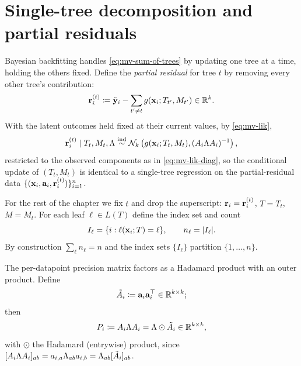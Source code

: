 \section{Single-tree decomposition and partial residuals}
\label{sec:mv-partial-resid}

Bayesian backfitting handles \eqref{eq:mv-sum-of-trees} by updating one tree
at a time, holding the others fixed. Define the \emph{partial residual} for
tree $t$ by removing every other tree's contribution:
\begin{equation}
	\label{eq:mv-partial-resid}
	\mathbf{r}_i^{(t)} \coloneqq \tilde{\mathbf{y}}_i - \sum_{t' \ne t} g(\mathbf{x}_i; T_{t'}, M_{t'})
	\in \mathbb{R}^k.
\end{equation}
With the latent outcomes held fixed at their current values, by
\eqref{eq:mv-lik},
\begin{equation}
	\label{eq:mv-partial-lik}
	\mathbf{r}_i^{(t)} \mid T_t, M_t, \Lambda \stackrel{\text{ind}}{\sim}
	\mathcal{N}_k\left(g(\mathbf{x}_i;  T_t, M_t),  (A_i \Lambda A_i)^{-1}\right),
\end{equation}
restricted to the observed components as in \eqref{eq:mv-lik-diag}, so the
conditional update of $(T_t, M_t)$ is identical to a single-tree
regression on the partial-residual data $\{(\mathbf{x}_i, \mathbf{a}_i, \mathbf{r}_i^{(t)})\}_{i=1}^n$.

For the rest of the chapter we fix $t$ and drop the superscript:
$\mathbf{r}_i = \mathbf{r}_i^{(t)}$, $T = T_t$, $M = M_t$. For each leaf $\ell \in L(T)$
define the index set and count
\begin{equation}
	\label{eq:mv-Iell}
	I_\ell = \{  i : \ell(\mathbf{x}_i; T) = \ell  \},
	\qquad
	n_\ell = |I_\ell|.
\end{equation}
By construction $\sum_{\ell} n_\ell = n$ and the index sets $\{I_\ell\}$
partition $\{1,\dots,n\}$.

The per-datapoint precision matrix factors as a Hadamard product with an
outer product. Define
\begin{equation}
	\label{eq:mv-Atilde}
	\tilde{A}_i  \coloneqq  \mathbf{a}_i\mathbf{a}_i^\top  \in \mathbb{R}^{k\times k};
\end{equation}
then
\begin{equation}
	\label{eq:mv-Pi}
	P_i  \coloneqq  A_i \Lambda A_i
	= \Lambda \odot \tilde{A}_i
	 \in \mathbb{R}^{k\times k},
\end{equation}
with $\odot$ the Hadamard (entrywise) product, since
$[A_i\Lambda A_i]_{ab} = a_{i,a}\Lambda_{ab}a_{i,b}
	= \Lambda_{ab} [\tilde{A}_i]_{ab}$.

